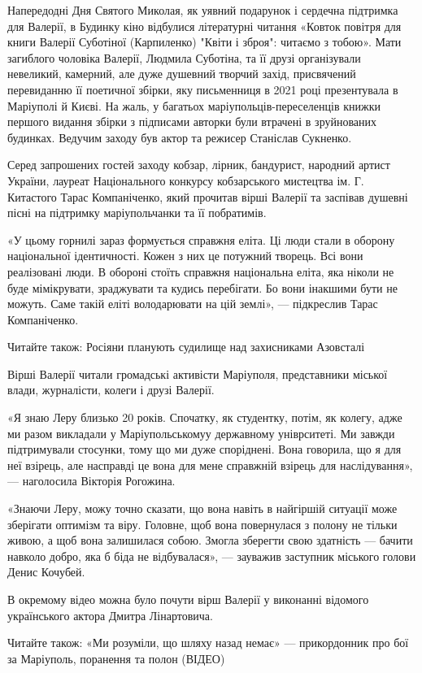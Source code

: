 Напередодні Дня Святого Миколая, як уявний подарунок і сердечна підтримка для
Валерії, в Будинку кіно відбулися літературні читання «Ковток повітря для книги
Валерії Суботіної (Карпиленко) "Квіти і зброя": читаємо з тобою». Мати
загиблого чоловіка Валерії, Людмила Суботіна, та її друзі організували
невеликий, камерний, але дуже душевний творчий захід, присвячений перевиданню
її поетичної збірки, яку письменниця в 2021 році презентувала в Маріуполі й
Києві. На жаль, у багатьох маріупольців-переселенців книжки першого видання
збірки з підписами авторки були втрачені в зруйнованих будинках. Ведучим заходу
був актор та режисер Станіслав Сукненко. 

Серед запрошених гостей заходу кобзар, лірник, бандурист, народний артист
України, лауреат Національного конкурсу кобзарського мистецтва ім. Г. Китастого
Тарас Компаніченко, який прочитав вірші Валерії та заспівав душевні пісні на
підтримку маріупольчанки та її побратимів.

«У цьому горнилі зараз формується справжня еліта. Ці люди стали в оборону
національної ідентичності. Кожен з них це потужний творець. Всі вони
реалізовані люди. В обороні стоїть справжня національна еліта, яка ніколи не
буде мімікрувати, зраджувати та кудись перебігати. Бо вони інакшими бути не
можуть. Саме такій еліті володарювати на цій землі», — підкреслив Тарас
Компаніченко.

Читайте також: Росіяни планують судилище над захисниками Азовсталі

Вірші Валерії читали громадські активісти Маріуполя, представники міської
влади, журналісти, колеги і друзі Валерії.

«Я знаю Леру близько 20 років. Спочатку, як студентку, потім, як колегу, адже
ми разом викладали у Маріупольськомуу державному уніврситеті. Ми завжди
підтримували стосунки, тому що ми дуже споріднені. Вона говорила, що я для неї
взірець, але насправді це вона для мене справжній взірець для наслідування», —
наголосила Вікторія Рогожина.

«Знаючи Леру, можу точно сказати, що вона навіть в найгіршій ситуації може
зберігати оптимізм та віру. Головне, щоб вона повернулася з полону не тільки
живою, а щоб вона залишилася собою. Змогла зберегти свою здатність — бачити
навколо добро, яка б біда не відбувалася», — зауважив заступник міського голови
Денис Кочубей.

В окремому відео можна було почути вірш Валерії у виконанні відомого
українського актора Дмитра Лінартовича.

Читайте також: «Ми розуміли, що шляху назад немає» — прикордонник про бої за
Маріуполь, поранення та полон (ВІДЕО)

